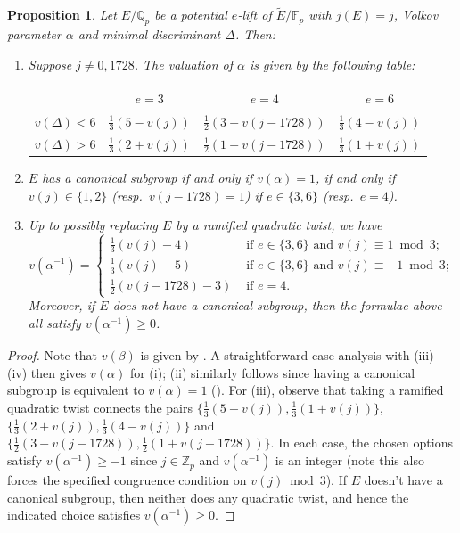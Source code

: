 \documentclass{amsart}
\newcommand{\Qp}{\mathbb{Q}_p}
\newtheorem{proposition}[theorem]{Proposition}
\theoremstyle{definition}
\newcommand{\Z}{\mathbb{Z}}
\numberwithin{theorem}{section}
\numberwithin{equation}{section}
\begin{document}
\begin{proposition}\label{proposition: formula valuation alpha}
Let $E/\Qp$ be a potential $e$-lift of $\tilde{E}/\mathbb{F}_p$ with $j(E)=j$, Volkov parameter $\alpha$ and minimal discriminant $\Delta$. Then:
\begin{enumerate}
\item Suppose $j \neq 0,1728$. The valuation of $\alpha$ is given by the following table: 
    
\begin{center}
 \begin{tabular}{c|ccc}
     & $e=3$ & $e=4$ & $e=6$ \\ \hline 
     $v(\Delta) < 6$  & $\frac{1}{3}(5-v(j))$ & $\frac{1}{2}(3-v(j-1728))$ & $\frac{1}{3}(4-v(j))$ \\[0.1in]
     $v(\Delta) > 6$ & $\frac{1}{3}(2+v(j))$ & $\frac{1}{2}(1+v(j-1728))$ & $\frac{1}{3}(1+v(j))$
 \end{tabular}
\end{center}
\item $E$ has a canonical subgroup if and only if $v(\alpha)=1$, if and only if $v(j) \in \{1,2\}$ (resp.~$v(j-1728)=1$) if $e \in \{3,6\}$ (resp.~$e=4$).
\item Up to possibly replacing $E$ by a ramified quadratic twist, we have
\[
v(\alpha^{-1})= \begin{cases}
\frac{1}{3}(v(j)-4) &\text{ if } e \in \{3,6\} \text{ and } v(j) \equiv 1 \bmod{3}; \\
\frac{1}{3}(v(j)-5) &\text{ if } e \in \{3,6\} \text{ and } v(j) \equiv -1 \bmod{3}; \\
\frac{1}{2}(v(j-1728)-3) &\text{ if } e=4.
\end{cases}
\]
Moreover, if $E$ does not have a canonical subgroup, then the formulae above all satisfy $v(\alpha^{-1}) \geq 0$.
\end{enumerate}
\end{proposition}

\begin{proof}
Note that $v(\beta)$ is given by . A straightforward case analysis with (iii)-(iv) then gives $v(\alpha)$ for (i); (ii) similarly follows since having a canonical subgroup is equivalent to $v(\alpha)=1$ (). 
For (iii), observe that taking a ramified quadratic twist connects the pairs $\{\frac{1}{3}(5-v(j)), \frac{1}{3}(1+v(j))\}$, $\{\frac{1}{3}(2+v(j)),\frac{1}{3}(4-v(j))\}$ and $\{\frac{1}{2}(3-v(j-1728)),\frac{1}{2}(1+v(j-1728))\}$. In each case, the chosen options satisfy $v(\alpha^{-1}) \geq - 1$ since $j \in \Z_p$ and $v(\alpha^{-1})$ is an integer (note this also forces the specified congruence condition on $v(j) \bmod{3}$). If $E$ doesn't have a canonical subgroup, then neither does any quadratic twist, and hence the indicated choice satisfies $v(\alpha^{-1}) \geq 0$. 
\end{proof}
\end{document}

